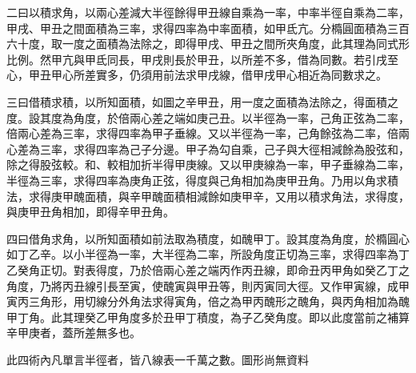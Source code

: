\begin{pinyinscope}
二曰以積求角，以兩心差減大半徑餘得甲丑線自乘為一率，中率半徑自乘為二率，甲戌、甲丑之間面積為三率，求得四率為中率面積，如甲氐亢。分橢圓面積為三百六十度，取一度之面積為法除之，即得甲戌、甲丑之間所夾角度，此其理為同式形比例。然甲亢與甲氐同長，甲戌則長於甲丑，以所差不多，借為同數。若引戌至心，甲丑甲心所差實多，仍須用前法求甲戌線，借甲戌甲心相近為同數求之。

三曰借積求積，以所知面積，如圖之辛甲丑，用一度之面積為法除之，得面積之度。設其度為角度，於倍兩心差之端如庚己丑。以半徑為一率，己角正弦為二率，倍兩心差為三率，求得四率為甲子垂線。又以半徑為一率，己角餘弦為二率，倍兩心差為三率，求得四率為己子分邊。甲子為勾自乘，己子與大徑相減餘為股弦和，除之得股弦較。和、較相加折半得甲庚線。又以甲庚線為一率，甲子垂線為二率，半徑為三率，求得四率為庚角正弦，得度與己角相加為庚甲丑角。乃用以角求積法，求得庚甲醜面積，與辛甲醜面積相減餘如庚甲辛，又用以積求角法，求得度，與庚甲丑角相加，即得辛甲丑角。

四曰借角求角，以所知面積如前法取為積度，如醜甲丁。設其度為角度，於橢圓心如丁乙辛。以小半徑為一率，大半徑為二率，所設角度正切為三率，求得四率為丁乙癸角正切。對表得度，乃於倍兩心差之端丙作丙丑線，即命丑丙甲角如癸乙丁之角度，乃將丙丑線引長至寅，使醜寅與甲丑等，則丙寅同大徑。又作甲寅線，成甲寅丙三角形，用切線分外角法求得寅角，倍之為甲丙醜形之醜角，與丙角相加為醜甲丁角。此其理癸乙甲角度多於丑甲丁積度，為子乙癸角度。即以此度當前之補算辛甲庚者，蓋所差無多也。

此四術內凡單言半徑者，皆八線表一千萬之數。圖形尚無資料


\end{pinyinscope}